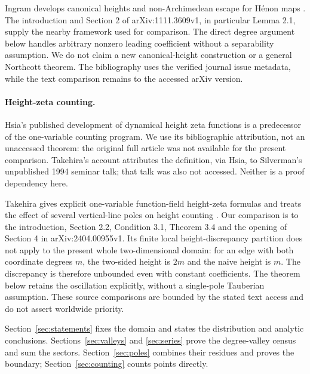 Ingram develops canonical heights and non-Archimedean escape for
H\'enon maps \citep{ingram2014canonical}. The introduction and
Section 2 of arXiv:1111.3609v1, in particular Lemma 2.1, supply the
nearby framework used for comparison. The direct degree argument
below handles arbitrary nonzero leading coefficient without a
separability assumption. We do not claim a new canonical-height
construction or a general Northcott theorem. The bibliography uses
the verified journal issue metadata, while the text comparison remains
to the accessed arXiv version.

\paragraph{Height-zeta counting.}
Hsia's published development of dynamical height zeta functions
\citep{hsia1997dynamical} is a predecessor of the one-variable
counting program. We use its bibliographic attribution, not an
unaccessed theorem: the original full article was not available for
the present comparison. Takehira's account attributes the definition,
via Hsia, to Silverman's unpublished 1994 seminar talk; that talk
was also not accessed. Neither is a proof dependency here.

Takehira gives explicit one-variable function-field height-zeta
formulas and treats the effect of several vertical-line poles on
height counting \citep{takehira2025number}. Our comparison is to
the introduction, Section 2.2, Condition 3.1, Theorem 3.4 and the
opening of Section 4 in arXiv:2404.00955v1. Its finite local
height-discrepancy partition does not apply to the present whole
two-dimensional domain: for an edge with both coordinate degrees
$m$, the two-sided height is $2m$ and the naive height is $m$.
The discrepancy is therefore unbounded even with constant coefficients.
The theorem below retains the oscillation explicitly, without a
single-pole Tauberian assumption. These source comparisons are bounded
by the stated text access and do not assert worldwide priority.

Section~\ref{sec:statements} fixes the domain and states the
distribution and analytic conclusions. Sections~\ref{sec:valleys}
and \ref{sec:series} prove the degree-valley census and sum the
sectors. Section~\ref{sec:poles} combines their residues and proves
the boundary; Section~\ref{sec:counting} counts points directly.
